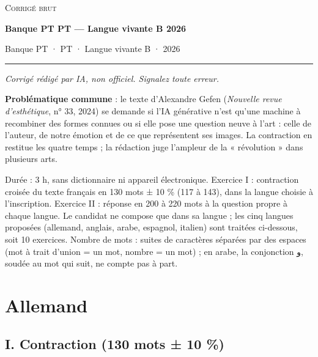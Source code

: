 \documentclass[11pt,a4paper]{article}
\begin{document}
\thispagestyle{plain}
\begin{center}
  {\small\scshape Corrigé brut}\par\smallskip
  {\LARGE\bfseries Banque PT PT — Langue vivante B 2026\par}\medskip
  {\large Banque PT · PT · Langue vivante B · 2026\par}
\end{center}
\vspace{2pt}\hrule\vspace{8pt}

\emph{Corrigé rédigé par IA, non officiel. Signalez toute erreur.}

\textbf{Problématique commune} : le texte d'Alexandre Gefen (\emph{Nouvelle revue d'esthétique}, n° 33, 2024) se demande si l'IA générative n'est qu'une machine à recombiner des formes connues ou si elle pose une question neuve à l'art : celle de l'auteur, de notre émotion et de ce que représentent ses images. La contraction en restitue les quatre temps ; la rédaction juge l'ampleur de la « révolution » dans plusieurs arts.

Durée : 3 h, sans dictionnaire ni appareil électronique. Exercice I : contraction croisée du texte français en 130 mots ± 10 \% (117 à 143), dans la langue choisie à l'inscription. Exercice II : réponse en 200 à 220 mots à la question propre à chaque langue. Le candidat ne compose que dans sa langue ; les cinq langues proposées (allemand, anglais, arabe, espagnol, italien) sont traitées ci-dessous, soit 10 exercices. Nombre de mots : suites de caractères séparées par des espaces (mot à trait d'union = un mot, nombre = un mot) ; en arabe, la conjonction و, soudée au mot qui suit, ne compte pas à part.

\hypertarget{allemand}{%
\section{Allemand}\label{allemand}}

\hypertarget{i.-contraction-130-mots-10}{%
\subsection{I. Contraction (130 mots ± 10 \%)}\label{i.-contraction-130-mots-10}}
\end{document}

